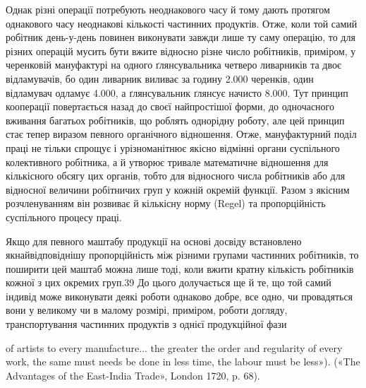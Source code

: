  Однак різні операції потребують неоднакового часу й тому
дають протягом однакового часу неоднакові кількості частинних
продуктів. Отже, коли той самий робітник день-у-день повинен
виконувати завжди лише ту саму операцію, то для різних
операцій мусить бути вжите відносно різне число робітників,
приміром, у черенковій мануфактурі на одного ґлянсувальника
четверо ливарників та двоє відламувачів, бо один ливарник виливає
за годину 2.000 черенків, один відламувач одламує 4.000, а
ґлянсувальник ґлянсує начисто 8.000. Тут принцип кооперації
повертається назад до своєї найпростішої форми, до одночасного
вживання багатьох робітників, що роблять однорідну роботу,
але цей принцип стає тепер виразом певного органічного відношення.
Отже, мануфактурний поділ праці не тільки спрощує
і урізноманітнює якісно відмінні органи суспільного колективного
робітника, а й утворює тривале математичне відношення
для кількісного обсягу цих органів, тобто для відносного числа
робітників або для відносної величини робітничих груп у кожній
окремій функції. Разом з якісним розчленуванням він розвиває
й кількісну норму (Regel) та пропорційність суспільного процесу
праці.

Якщо для певного маштабу продукції на основі досвіду встановлено
якнайвідповіднішу пропорційність між різними групами
частинних робітників, то поширити цей маштаб можна лише тоді,
коли вжити кратну кількість робітників кожної з цих окремих
груп.39 До цього долучається ще й те, що той самий індивід може
виконувати деякі роботи однаково добре, все одно, чи провадяться
вони у великому чи в малому розмірі, приміром, роботи догляду,
транспортування частинних продуктів з однієї продукційної фази

of artists to every manufacture... the greater the order and regularity of
every work, the same must needs be done in less time, the labour must
be less»). («The Advantages of the East-India Trade», London 1720, p. 68).
\parbreak{}  %
